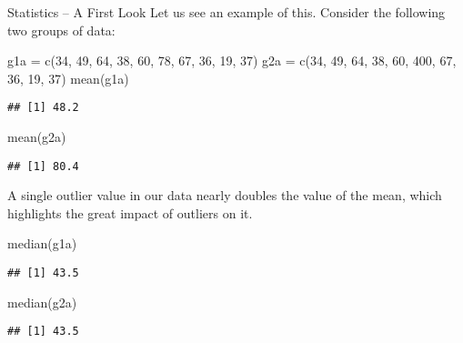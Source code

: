 \documentclass[
  ignorenonframetext,
]{beamer}
\newenvironment{Shaded}{\begin{snugshade}}{\end{snugshade}}
\newcommand{\DecValTok}[1]{\textcolor[rgb]{0.00,0.00,0.81}{#1}}
\newcommand{\FunctionTok}[1]{\textcolor[rgb]{0.00,0.00,0.00}{#1}}
\newcommand{\NormalTok}[1]{#1}
\newcommand{\OtherTok}[1]{\textcolor[rgb]{0.56,0.35,0.01}{#1}}
\begin{document}
\begin{frame}[fragile]{Statistics -- A First Look}
\protect\hypertarget{statistics-a-first-look-1}{}
Let us see an example of this. Consider the following two groups of
data:

\begin{Shaded}
\begin{Highlighting}[]
\NormalTok{g1a }\OtherTok{=} \FunctionTok{c}\NormalTok{(}\DecValTok{34}\NormalTok{, }\DecValTok{49}\NormalTok{, }\DecValTok{64}\NormalTok{, }\DecValTok{38}\NormalTok{, }\DecValTok{60}\NormalTok{, }\DecValTok{78}\NormalTok{, }\DecValTok{67}\NormalTok{, }\DecValTok{36}\NormalTok{, }\DecValTok{19}\NormalTok{, }\DecValTok{37}\NormalTok{) }
\NormalTok{g2a }\OtherTok{=} \FunctionTok{c}\NormalTok{(}\DecValTok{34}\NormalTok{, }\DecValTok{49}\NormalTok{, }\DecValTok{64}\NormalTok{, }\DecValTok{38}\NormalTok{, }\DecValTok{60}\NormalTok{, }\DecValTok{400}\NormalTok{, }\DecValTok{67}\NormalTok{, }\DecValTok{36}\NormalTok{, }\DecValTok{19}\NormalTok{, }\DecValTok{37}\NormalTok{) }
\FunctionTok{mean}\NormalTok{(g1a) }
\end{Highlighting}
\end{Shaded}

\begin{verbatim}
## [1] 48.2
\end{verbatim}

\begin{Shaded}
\begin{Highlighting}[]
\FunctionTok{mean}\NormalTok{(g2a)}
\end{Highlighting}
\end{Shaded}

\begin{verbatim}
## [1] 80.4
\end{verbatim}

A single outlier value in our data nearly doubles the value of the mean,
which highlights the great impact of outliers on it.
\end{frame}

\begin{frame}[fragile]
\begin{Shaded}
\begin{Highlighting}[]
\FunctionTok{median}\NormalTok{(g1a)}
\end{Highlighting}
\end{Shaded}

\begin{verbatim}
## [1] 43.5
\end{verbatim}

\begin{Shaded}
\begin{Highlighting}[]
\FunctionTok{median}\NormalTok{(g2a)}
\end{Highlighting}
\end{Shaded}

\begin{verbatim}
## [1] 43.5
\end{verbatim}
\end{frame}
\end{document}
